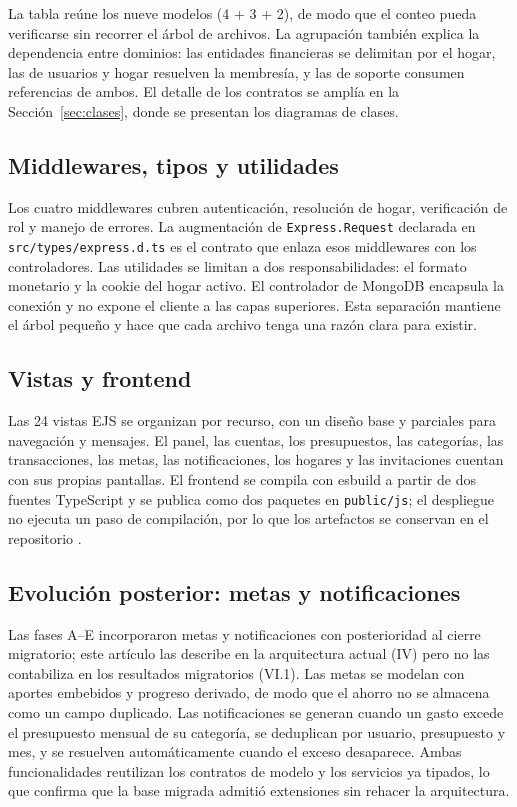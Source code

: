 \documentclass[conference]{IEEEtran}
\begin{document}
La tabla reúne los nueve modelos (4 + 3 + 2), de modo que el conteo pueda
verificarse sin recorrer el árbol de archivos. La agrupación también explica la
dependencia entre dominios: las entidades
financieras se delimitan por el hogar, las de usuarios y hogar resuelven la
membresía, y las de soporte consumen referencias de ambos. El detalle de los
contratos se amplía en la Sección~\ref{sec:clases}, donde se presentan los
diagramas de clases.

\subsection{Middlewares, tipos y utilidades}

Los cuatro middlewares cubren autenticación, resolución de hogar, verificación
de rol y manejo de errores. La augmentación de \texttt{Express.Request} declarada
en \texttt{src/types/express.d.ts} es el contrato que enlaza esos middlewares con
los controladores. Las utilidades se limitan a dos responsabilidades: el formato
monetario y la cookie del hogar activo. El controlador de MongoDB encapsula la
conexión y no expone el cliente a las capas superiores. Esta separación mantiene
el árbol pequeño y hace que cada archivo tenga una razón clara para existir.

\subsection{Vistas y frontend}

Las 24 vistas EJS se organizan por recurso, con un diseño base y parciales para
navegación y mensajes. El panel, las cuentas, los presupuestos, las categorías,
las transacciones, las metas, las notificaciones, los hogares y las
invitaciones cuentan con sus propias pantallas. El frontend se compila con
esbuild a partir de dos fuentes TypeScript y se publica como dos paquetes en
\texttt{public/js}; el despliegue no ejecuta un paso de compilación, por lo que
los artefactos se conservan en el repositorio \cite{esbuild}.

\subsection{Evolución posterior: metas y notificaciones}

Las fases A--E incorporaron metas y notificaciones con posterioridad al cierre
migratorio; este artículo las describe en la arquitectura actual (IV) pero no
las contabiliza en los resultados migratorios (VI.1). Las metas
se modelan con aportes embebidos y progreso derivado, de modo que el ahorro no
se almacena como un campo duplicado. Las notificaciones se generan cuando un
gasto excede el presupuesto mensual de su categoría, se deduplican por usuario,
presupuesto y mes, y se resuelven automáticamente cuando el exceso desaparece.
Ambas funcionalidades reutilizan los contratos de modelo y los servicios ya
tipados, lo que confirma que la base migrada admitió extensiones sin rehacer la
arquitectura.
\end{document}
